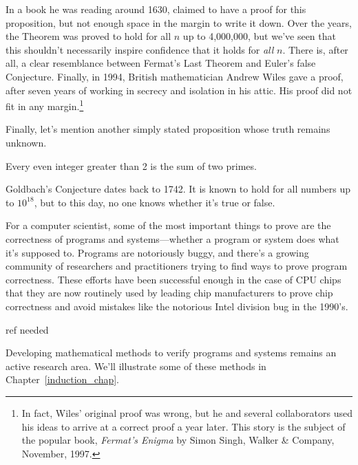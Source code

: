 In a book he was reading around 1630,  claimed to have a
proof for this proposition, but not enough space in the margin to
write it down.  Over the years, the Theorem was proved to hold for all
$n$ up to 4,000,000, but we've seen that this shouldn't necessarily
inspire confidence that it holds for \emph{all} $n$.  There is, after
all, a clear resemblance between Fermat's Last Theorem and Euler's
false Conjecture.  Finally, in 1994, British mathematician Andrew
Wiles gave a proof, after seven years of working in secrecy and
isolation in his attic.  His proof did not fit in any
margin.\footnote{In fact, Wiles' original proof was wrong, but he and
  several collaborators used his ideas to arrive at a correct proof a
  year later.  This story is the subject of the popular book,
  \emph{Fermat's Enigma} by Simon Singh, Walker \& Company, November,
  1997.}

Finally, let's mention another simply stated proposition whose truth
remains unknown.

\begin{proposition}\label{Goldbach}
Every even integer greater than 2 is the sum of two primes.
\end{proposition}

Goldbach's Conjecture dates back to 1742.  It is known to hold for all
numbers up to $10^{18}$, but to this day, no one knows whether it's
true or false.

\vspace{0.3in}
For a computer scientist, some of the most important things to prove are
the correctness of programs and systems---whether a program or system
does what it's supposed to.  Programs are notoriously buggy, and there's a
growing community of researchers and practitioners trying to find ways to
prove program correctness.  These efforts have been successful enough in
the case of CPU chips that they are now routinely used by leading chip
manufacturers to prove chip correctness and avoid mistakes like the
notorious Intel division bug in the 1990's.
\begin{editingnotes}
ref needed
\end{editingnotes}

Developing mathematical methods to verify programs and systems remains
an active research area.  We'll illustrate some of these methods in
Chapter~\ref{induction_chap}.

\begin{problems}
\practiceproblems
{}

\classproblems
{}
\end{problems}

